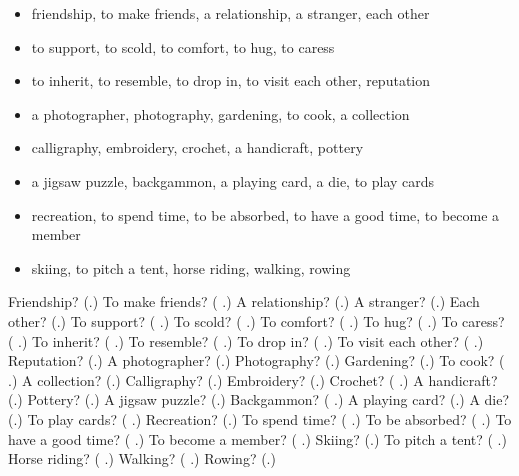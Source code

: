 \begin{itemize}
\raggedright
  \item friendship, to make friends, a relationship, a stranger, each other
  \item to support, to scold, to comfort, to hug, to caress
  \item to inherit, to resemble, to drop in, to visit each other, reputation
  \item a photographer, photography, gardening, to cook, a collection
  \item calligraphy, embroidery, crochet, a handicraft, pottery
  \item a jigsaw puzzle, backgammon, a playing card, a die, to play cards
  \item recreation, to spend time, to be absorbed, to have a good time, to become a member
  \item skiing, to pitch a tent, horse riding, walking, rowing
\end{itemize}

\begin{tcolorbox}[breakable,colback=teal!4,colframe=teal!35!black,title={Before you move on}]
Friendship? (\textbf{}.) To make friends? (\textbf{ }.) A relationship? (\textbf{}.) A stranger? (\textbf{}.) Each other? (\textbf{}.) To support? (\textbf{ }.) To scold? (\textbf{ }.) To comfort? (\textbf{ }.) To hug? (\textbf{ }.) To caress? (\textbf{ }.) To inherit? (\textbf{ }.) To resemble? (\textbf{ }.) To drop in? (\textbf{ }.) To visit each other? (\textbf{   }.) Reputation? (\textbf{}.) A photographer? (\textbf{}.) Photography? (\textbf{}.) Gardening? (\textbf{}.) To cook? (\textbf{ }.) A collection? (\textbf{}.) Calligraphy? (\textbf{}.) Embroidery? (\textbf{}.) Crochet? (\textbf{ }.) A handicraft? (\textbf{}.) Pottery? (\textbf{}.) A jigsaw puzzle? (\textbf{}.) Backgammon? (\textbf{ }.) A playing card? (\textbf{}.) A die? (\textbf{}.) To play cards? (\textbf{  }.) Recreation? (\textbf{}.) To spend time? (\textbf{ }.) To be absorbed? (\textbf{ }.) To have a good time? (\textbf{ }.) To become a member? (\textbf{ }.) Skiing? (\textbf{}.) To pitch a tent? (\textbf{ }.) Horse riding? (\textbf{ }.) Walking? (\textbf{ }.) Rowing? (\textbf{}.)
\end{tcolorbox}
